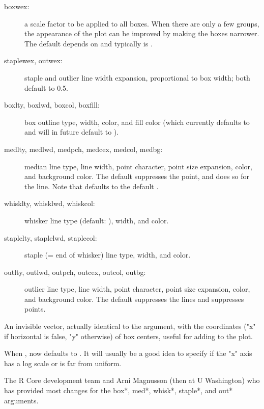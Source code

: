 \begin{Arguments}
\begin{ldescription}
\begin{description}
\item[boxwex:] a scale factor to be applied to all boxes.  When there
are only a few groups, the appearance of the plot can be improved by
making the boxes narrower.  The default depends on  and
typically is .
\item[staplewex, outwex:] staple and outlier line width expansion,
proportional to box width; both default to 0.5.
\item[boxlty, boxlwd, boxcol, boxfill:] box outline type, width,
color, and fill color (which currently defaults to  and will
in future default to ).
\item[medlty, medlwd, medpch, medcex, medcol, medbg:] median line type,
line width, point character, point size expansion, color, and
background color.  The default  suppresses the
point, and  does so for the line.
Note that defaults to
\eqn{3\times}{} the default .
\item[whisklty, whisklwd, whiskcol:] whisker line type (default:
), width, and color.
\item[staplelty, staplelwd, staplecol:] staple (= end of whisker) line
type, width, and color.
\item[outlty, outlwd, outpch, outcex, outcol, outbg:] outlier line
type, line width, point character, point size expansion, color, and
background color.  The default  suppresses the
lines and  suppresses points.

\end{description}


\end{ldescription}
\end{Arguments}
%
\begin{Value}
An invisible vector, actually identical to the  argument,
with the coordinates ("x" if horizontal is false, "y" otherwise) of
box centers, useful for adding to the plot.
\end{Value}
%
\begin{Note}\relax
When ,  now defaults to .  It will usually be a good idea to
specify  if the "x" axis has a log scale or  is
far from uniform.
\end{Note}
%
\begin{Author}\relax
The R Core development team and Arni Magnusson
(then at U Washington) who has provided most changes for the
box*, med*, whisk*, staple*, and out* arguments.
\end{Author}
